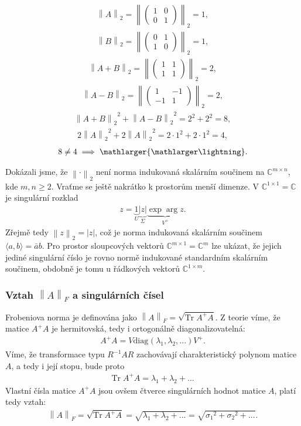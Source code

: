\documentclass[]{article}
\renewcommand{\C}{\mathbb{C}}
\newcommand{\Tr}{\mathrm{Tr}\;}
\newcommand{\diag}[2]{\mathrm{diag}_{#1}(#2)}
\newcommand{\norm}[1]{\left\lVert#1\right\rVert}
\newcommand{\mat}[1]{\begin{pmatrix}#1\end{pmatrix}}
\newcommand{\x}{\times}
\begin{document}
\begin{align*}
  \norm{A}_2
  = \norm{\mat{
    1 & 0 \\ 0 & 1
  }}_2
  = 1,
\end{align*}
\begin{align*}
  \norm{B}_2
  = \norm{\mat{
    0 & 1 \\ 1 & 0
  }}_2
  = 1,
\end{align*}
\begin{align*}
  \norm{A+B}_2
  = \norm{\mat{
    1 & 1 \\ 1 & 1
  }}_2
  = 2,
\end{align*}
\begin{align*}
  \norm{A-B}_2
  = \norm{\mat{
    1 & -1 \\ -1 & 1
  }}_2
  = 2,
\end{align*}
\begin{align*}
  {\norm{A+B}_2}^2 + {\norm{A-B}_2}^2 = 2^2 + 2^2 = 8,
\end{align*}
\begin{align*}
  2 {\norm{A}_2}^2 + 2 {\norm{A}_2}^2 = 2 \cdot 1^2 + 2 \cdot 1^2 = 4,
\end{align*}
\begin{align*}
  8 \not= 4 \implies \mathlarger{\mathlarger\lightning}.
\end{align*}

Dokázali jsme, že $\norm{\cdot}_2$ není norma indukovaná skalárním součinem na $\C^{m \x n}$, kde $m,n \geq 2$. Vraťme se ještě nakrátko k prostorům menší dimenze. V $\C^{1\x1} = \C$ je singulární rozklad
\begin{align*}
  z = \underbrace{1}_U \underbrace{|z|}_\Sigma \underbrace{\exp \arg z}_{V^+}.
\end{align*}
Zřejmě tedy $\norm{z}_2 = |z|$, což je norma indukovaná skalárním součinem $\langle a, b \rangle = \bar{a}b$. Pro prostor sloupcových vektorů $\C^{m\x1} = \C^m$ lze ukázat, že jejich jediné singulární číslo je rovno normě indukované standardním skalárním součinem, obdobně je tomu u řádkových vektorů $\C^{1 \x m}$.


\subsubsection{Vztah $\norm{A}_F$ a singulárních čísel}
Frobeniova norma je definována jako $\norm{A}_F = \sqrt{\Tr A^+A}$. Z teorie víme, že matice $A^+A$ je hermitovská, tedy i ortogonálně diagonalizovatelná:
\begin{align*}
  A^+A = V \diag{}{\lambda_1, \lambda_2, ...} V^+.
\end{align*}
Víme, že transformace typu $R^{-1}AR$ zachovávají charakteristický polynom matice $A$, a tedy i její stopu, bude proto
\begin{align*}
  \Tr A^+ A = \lambda_1 + \lambda_2 + ...
\end{align*}
Vlastní čísla matice $A^+A$ jsou ovšem čtverce singulárních hodnot matice $A$, platí tedy vztah:
\begin{align*}
  \norm{A}_F
  = \sqrt{\Tr A^+A}
  = \sqrt{\lambda_1 + \lambda_2 + ...}
  = \sqrt{ {\sigma_1}^2 + {\sigma_2}^2 + ... }.
\end{align*}
\end{document}
